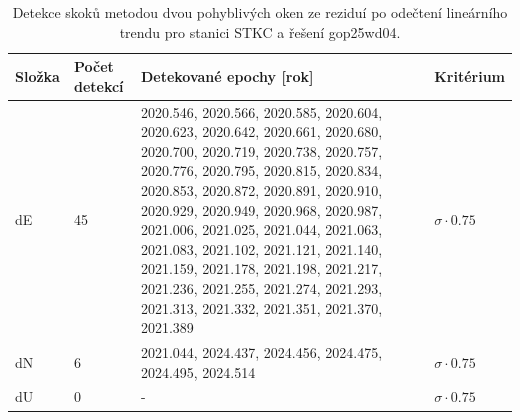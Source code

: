 \begin{table}[htbp]
\caption{Detekce skoků metodou dvou pohyblivých oken ze reziduí po odečtení lineárního trendu pro stanici STKC a řešení gop25wd04.}
\label{tab:gop25wd04_stcd_stkc_detr_weighted_1seg_jumps_sliding_window}
\begin{tabular}{llll}
\toprule
Složka & Počet detekcí & Detekované epochy [rok] & Kritérium \\
\midrule
dE & 45 & 2020.546, 2020.566, 2020.585, 2020.604, 2020.623, 2020.642, 2020.661, 2020.680, 2020.700, 2020.719, 2020.738, 2020.757, 2020.776, 2020.795, 2020.815, 2020.834, 2020.853, 2020.872, 2020.891, 2020.910, 2020.929, 2020.949, 2020.968, 2020.987, 2021.006, 2021.025, 2021.044, 2021.063, 2021.083, 2021.102, 2021.121, 2021.140, 2021.159, 2021.178, 2021.198, 2021.217, 2021.236, 2021.255, 2021.274, 2021.293, 2021.313, 2021.332, 2021.351, 2021.370, 2021.389 & $\sigma \cdot 0.75$ \\
dN & 6 & 2021.044, 2024.437, 2024.456, 2024.475, 2024.495, 2024.514 & $\sigma \cdot 0.75$ \\
dU & 0 & - & $\sigma \cdot 0.75$ \\
\bottomrule
\end{tabular}
\end{table}
